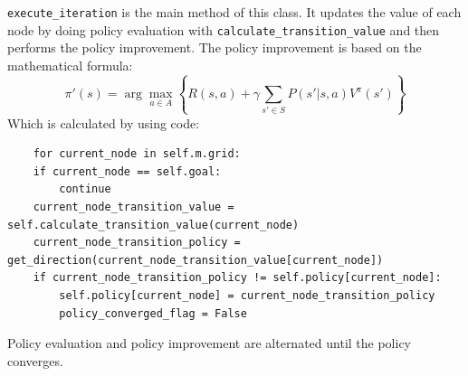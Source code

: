 \documentclass{article}
\begin{document}
\texttt{execute\_iteration} is the main method of this class. It updates the value of each node by doing policy evaluation with \texttt{calculate\_transition\_value} and then performs the policy improvement.
The policy improvement is based on the mathematical formula:
\[ \pi'(s) = \arg \max_{a \in A} \left\{ R(s, a) + \gamma \sum_{s' \in S} P(s'|s, a) V^{\pi}(s') \right\} \]
Which is calculated by using code:
\begin{lstlisting}
    for current_node in self.m.grid:
    if current_node == self.goal:
        continue
    current_node_transition_value = self.calculate_transition_value(current_node)
    current_node_transition_policy = get_direction(current_node_transition_value[current_node])
    if current_node_transition_policy != self.policy[current_node]:
        self.policy[current_node] = current_node_transition_policy
        policy_converged_flag = False
\end{lstlisting}
Policy evaluation and policy improvement are alternated until the policy converges.
\end{document}
